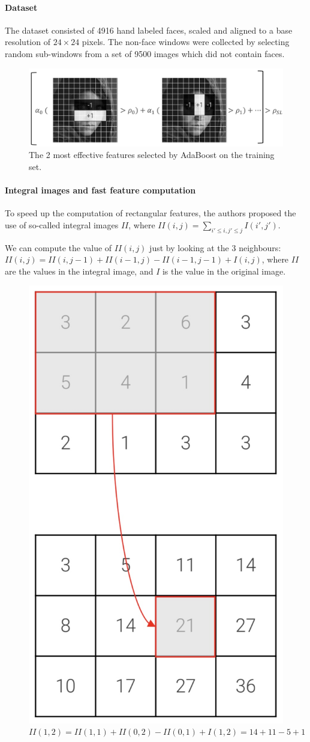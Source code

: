 \paragraph{Dataset}
The dataset consisted of 4916 hand labeled faces, scaled and aligned to a base resolution of $24 \times 24$ pixels.
The non-face windows were collected by selecting random sub-windows from a set of 9500 images which did not contain faces.

\begin{figure}[htbp]
  \centering
  \includegraphics[width=0.6\linewidth]{./img/adaboost.png}
  \caption{The 2 most effective features selected by AdaBoost on the training set.}
\end{figure}

\paragraph{Integral images and fast feature computation}
To speed up the computation of rectangular features, the authors proposed the use of so-called integral images $II$, where $II(i,j) = \sum_{i' \leq i, j' \leq j} I(i', j')$.

We can compute the value of $II(i,j)$ just by looking at the 3 neighbours: $II(i,j) = II(i, j-1) + II(i-1, j) - II(i-1, j-1) + I(i,j)$, where $II$ are the values in the integral image, and $I$ is the value in the original image.

\begin{figure}[htbp]
  \centering
  \includegraphics[width=0.6\linewidth]{./img/integral_images.jpg}
  \caption{$II(1,2) = II(1,1) + II(0,2) - II(0,1) + I(1,2) = 14 + 11 - 5 + 1$}
\end{figure}

